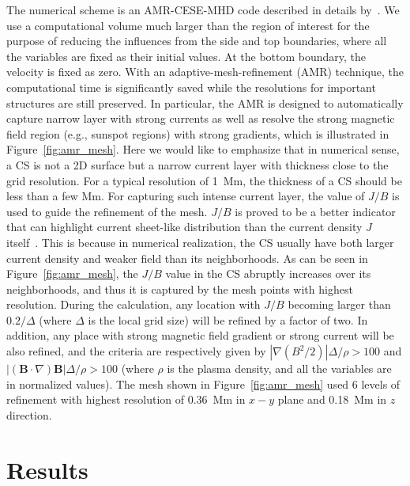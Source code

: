 \documentclass[twocolumn]{aastex6} %
\renewcommand{\vec}[1]{ {\mathbf #1} }
\newcommand{\Fig}{{Figure}}
\begin{document}
\begin{CJK*}{UTF8}{gbsn}
The numerical scheme is an AMR-CESE-MHD code described
in details by~\citet{Jiang2010}. We use a computational
volume much larger than the region of interest for the
purpose of reducing the influences from {the side and top boundaries, where all the
variables are fixed as their initial values. At the bottom boundary, the velocity is fixed as zero.}
With an adaptive-mesh-refinement (AMR) technique, the computational
time is significantly saved while the resolutions for important structures
are still preserved.
In particular, the AMR is
designed to automatically capture narrow layer with strong currents as
well as resolve the strong magnetic field region (e.g., sunspot
regions) with strong gradients, which is illustrated in
\Fig~\ref{fig:amr_mesh}. Here we would like to emphasize that in
numerical sense, a CS is not a 2D surface but a narrow current layer
with thickness close to the grid resolution. For a typical resolution
of 1~Mm, the thickness of a CS should be less than a few Mm. For
capturing such intense current layer, the value of $J/B$ is used to
guide the refinement of the mesh. $J/B$ is proved to be a better
indicator that can highlight current sheet-like distribution than the
current density $J$ itself~\citep{GibsonFan2006, Fan2007,
  Jiang2016ApJ}. This is because in numerical realization, the CS
usually have both larger current density and weaker field than its
neighborhoods. As can be seen in \Fig~\ref{fig:amr_mesh},
the $J/B$ value in the CS abruptly increases over its neighborhoods, and thus
it is captured by the mesh points with highest resolution. During the
calculation, any location with $J/B$ becoming larger than $0.2/\Delta$
(where $\Delta$ is the local grid size) will be refined by a factor of
two. In addition, any place with strong magnetic field gradient or
strong current will be also refined, and the criteria are respectively
given by $|\nabla (B^{2}/2)|\Delta/\rho > 100 $ and
$|(\vec B\cdot\nabla)\vec B|\Delta/\rho > 100$ (where $\rho$ is the
plasma density, and all the variables are in normalized values). The
mesh shown in \Fig~\ref{fig:amr_mesh} used 6 levels of refinement with
highest resolution of 0.36~Mm in $x-y$ plane and 0.18~Mm in $z$ direction.




\section{Results}
\label{sec:results}



\end{CJK*}
\end{document}
